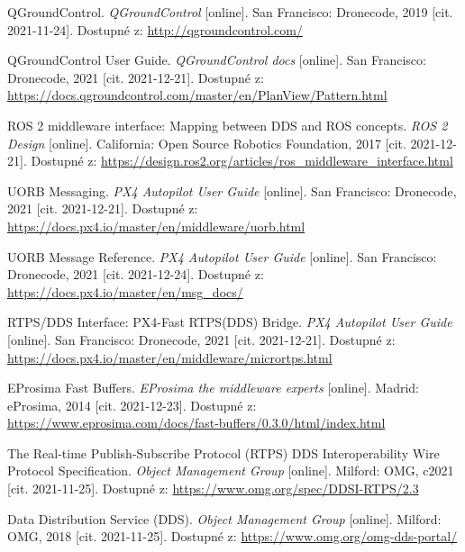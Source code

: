 \begin{thebibliography}{99}
QGroundControl. \textit{QGroundControl} [online]. San Francisco: Dronecode, 2019 [cit. 2021-11-24]. Dostupné z: \href{http://qgroundcontrol.com/}{http://qgroundcontrol.com/}

QGroundControl User Guide. \textit{QGroundControl docs} [online]. San Francisco: Dronecode, 2021 [cit. 2021-12-21]. Dostupné z: \href{https://docs.qgroundcontrol.com/master/en/PlanView/Pattern.html}{https://docs.qgroundcontrol.com/master/en/PlanView/Pattern.html}

ROS 2 middleware interface: Mapping between DDS and ROS concepts. \textit{ROS 2 Design} [online]. California: Open Source Robotics Foundation, 2017 [cit. 2021-12-21]. Dostupné z: \href{https://design.ros2.org/articles/ros\_middleware\_interface.html}{https://design.ros2.org/articles/ros\_middleware\_interface.html}

UORB Messaging. \textit{PX4 Autopilot User Guide} [online]. San Francisco: Dronecode, 2021 [cit. 2021-12-21]. Dostupné z: \href{https://docs.px4.io/master/en/middleware/uorb.html}{https://docs.px4.io/master/en/middleware/uorb.html}

UORB Message Reference. \textit{PX4 Autopilot User Guide} [online]. San Francisco: Dronecode, 2021 [cit. 2021-12-24]. Dostupné z: \href{https://docs.px4.io/master/en/msg\_docs/}{https://docs.px4.io/master/en/msg\_docs/}

RTPS/DDS Interface: PX4-Fast RTPS(DDS) Bridge. \textit{PX4 Autopilot User Guide} [online]. San Francisco: Dronecode, 2021 [cit. 2021-12-21]. Dostupné z: \href{https://docs.px4.io/master/en/middleware/micrortps.html}{https://docs.px4.io/master/en/middleware/micrortps.html}

EProsima Fast Buffers. \textit{EProsima the middleware experts} [online]. Madrid: eProsima, 2014 [cit. 2021-12-23]. Dostupné z: \href{https://www.eprosima.com/docs/fast-buffers/0.3.0/html/index.html}{https://www.eprosima.com/docs/fast-buffers/0.3.0/html/index.html}

The Real-time Publish-Subscribe Protocol (RTPS) DDS Interoperability Wire Protocol Specification. \textit{Object Management Group} [online]. Milford: OMG, c2021 [cit. 2021-11-25]. Dostupné z: \href{https://www.omg.org/spec/DDSI-RTPS/2.3}{https://www.omg.org/spec/DDSI-RTPS/2.3}
	
Data Distribution Service (DDS). \textit{Object Management Group} [online]. Milford: OMG, 2018 [cit. 2021-11-25]. Dostupné z: \href{https://www.omg.org/omg-dds-portal/}{https://www.omg.org/omg-dds-portal/}


\end{thebibliography}
